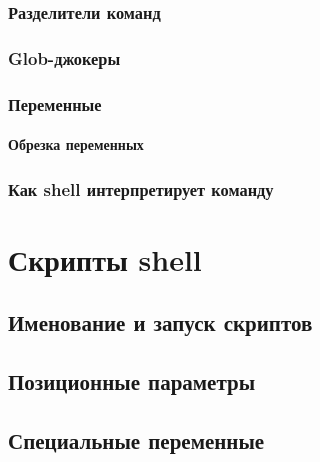 \documentclass[oneside]{book}
\begin{document}
			\subsection{Разделители команд}
			
			
			\subsection{Glob-джокеры}
			
			
			\subsection{Переменные}
			
						
				\subsubsection{Обрезка переменных}
				
			
			\subsection{Как shell интерпретирует команду}
			
		
	\chapter{Скрипты shell}
	
	
		\section{Именование и запуск скриптов}
		
		
		\section{Позиционные параметры}
		
		
		\section{Специальные переменные}
		
		
\end{document}
